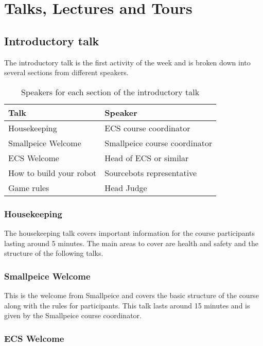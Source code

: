 \section{Talks, Lectures and Tours}

\subsection{Introductory talk}

The introductory talk is the first activity of the week and is broken down into several sections from different speakers.

\begin{table}[h]
\begin{tabular}{ll}
 Talk & Speaker \\
 \hline
 Housekeeping & ECS course coordinator \\
 Smallpeice Welcome &  Smallpeice course coordinator \\
 ECS Welcome & Head of ECS or similar \\
 How to build your robot & Sourcebots representative \\
 Game rules & Head Judge \\
\end{tabular}
\caption{Speakers for each section of the introductory talk}
\end{table}

\subsubsection{Housekeeping}

The housekeeping talk covers important information for the course participants lasting around 5 minutes.
The main areas to cover are health and safety and the structure of the following talks.

\subsubsection{Smallpeice Welcome}

This is the welcome from Smallpeice and covers the basic structure of the course along with the rules for participants.
This talk lasts around 15 minutes and is given by the Smallpeice course coordinator.

\subsubsection{ECS Welcome}

